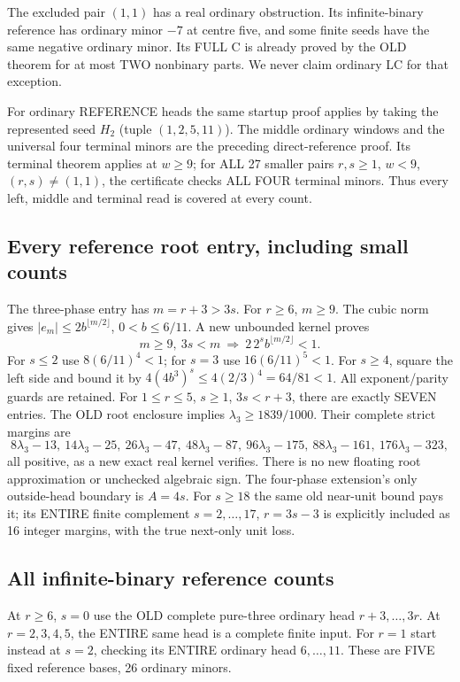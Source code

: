 The excluded pair $(1,1)$ has a real ordinary obstruction. Its
infinite-binary reference has ordinary minor $-7$ at centre five,
and some finite seeds have the same negative ordinary minor.
Its FULL C is already proved by the OLD theorem for at most TWO
nonbinary parts. We never claim ordinary LC for that exception.

For ordinary REFERENCE heads the same startup proof applies by
taking the represented seed $H_2$ (tuple $(1,2,5,11)$).
The middle ordinary windows and the universal four terminal minors
are the preceding direct-reference proof. Its terminal theorem
applies at $w\ge9$; for ALL 27 smaller pairs $r,s\ge1$, $w<9$,
$(r,s)\ne(1,1)$, the certificate checks ALL FOUR terminal minors.
Thus every left, middle and terminal read is covered at every count.

\subsection{Every reference root entry, including small counts}
The three-phase entry has $m=r+3>3s$. For $r\ge6$, $m\ge9$.
The cubic norm gives $|e_m|\le2b^{\lfloor m/2\rfloor}$,
$0<b\le6/11$. A new unbounded kernel proves
\[
 m\ge9,\ 3s<m\ \Longrightarrow\
              2\,2^s b^{\lfloor m/2\rfloor}<1.        \tag{3}
\]
For $s\le2$ use $8(6/11)^4<1$; for $s=3$ use
$16(6/11)^5<1$. For $s\ge4$, square the left side and bound
it by $4(4b^3)^s\le4(2/3)^4=64/81<1$.
All exponent/parity guards are retained.
For $1\le r\le5$, $s\ge1$, $3s<r+3$, there are exactly SEVEN
entries. The OLD root enclosure implies $\lambda_3\ge1839/1000$.
Their complete strict margins are
\[
 8\lambda_3-13,\ 14\lambda_3-25,\ 26\lambda_3-47,
 \ 48\lambda_3-87,\ 96\lambda_3-175,
 \ 88\lambda_3-161,\ 176\lambda_3-323,
\]
all positive, as a new exact real kernel verifies. There is no
new floating root approximation or unchecked algebraic sign.
The four-phase extension's only outside-head boundary is $A=4s$.
For $s\ge18$ the same old near-unit bound pays it; its ENTIRE
finite complement $s=2,\ldots,17$, $r=3s-3$ is explicitly
included as 16 integer margins, with the true next-only unit loss.

\subsection{All infinite-binary reference counts}
At $r\ge6$, $s=0$ use the OLD complete pure-three ordinary
head $r+3,\ldots,3r$. At $r=2,3,4,5$, the ENTIRE same head
is a complete finite input. For $r=1$ start instead at $s=2$,
checking its ENTIRE ordinary head $6,\ldots,11$.
These are FIVE fixed reference bases, 26 ordinary minors.


